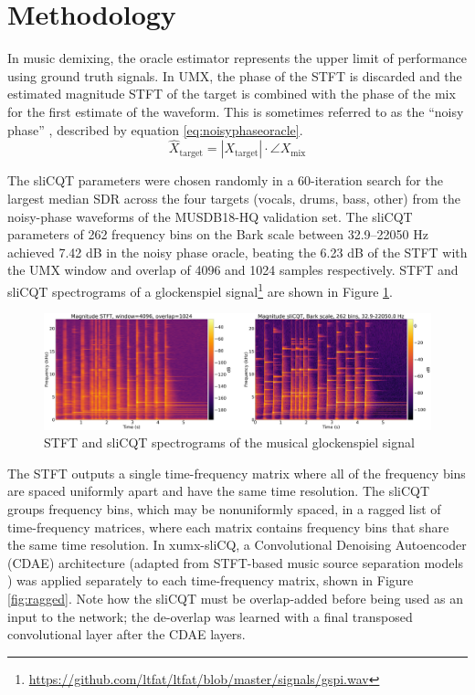 \documentclass{article}
\begin{document}
\section{Methodology}
\label{sec:method}

In music demixing, the oracle estimator represents the upper limit of performance using ground truth signals. In UMX, the phase of the STFT is discarded and the estimated magnitude STFT of the target is combined with the phase of the mix for the first estimate of the waveform. This is sometimes referred to as the ``noisy phase'' \cite{noisyphase1}, described by equation \eqref{eq:noisyphaseoracle}.
\begin{equation}\label{eq:noisyphaseoracle}
\hat{X}_{\text{target}} = |X_{\text{target}}| \cdot \angle{X_{\text{mix}}}
\end{equation}

The sliCQT parameters were chosen randomly in a 60-iteration search for the largest median SDR across the four targets (vocals, drums, bass, other) from the noisy-phase waveforms of the MUSDB18-HQ \cite{musdb18hq} validation set. The sliCQT parameters of 262 frequency bins on the Bark scale between 32.9--22050 Hz achieved 7.42 dB in the noisy phase oracle, beating the 6.23 dB of the STFT with the UMX window and overlap of 4096 and 1024 samples respectively. STFT and sliCQT spectrograms of a glockenspiel signal\footnote{\url{https://github.com/ltfat/ltfat/blob/master/signals/gspi.wav}} are shown in Figure \ref{fig:spectrograms}.

\begin{figure}[h]
	\includegraphics[width=\textwidth]{./spectrograms_comparison.png}
	\caption{STFT and sliCQT spectrograms of the musical glockenspiel signal}
	\label{fig:spectrograms}
\end{figure}

The STFT outputs a single time-frequency matrix where all of the frequency bins are spaced uniformly apart and have the same time resolution. The sliCQT groups frequency bins, which may be nonuniformly spaced, in a ragged list of time-frequency matrices, where each matrix contains frequency bins that share the same time resolution. In xumx-sliCQ, a Convolutional Denoising Autoencoder (CDAE) architecture (adapted from STFT-based music source separation models \cite{plumbley1, plumbley2}) was applied separately to each time-frequency matrix, shown in Figure \ref{fig:ragged}. Note how the sliCQT must be overlap-added before being used as an input to the network; the de-overlap was learned with a final transposed convolutional layer after the CDAE layers.
\end{document}
